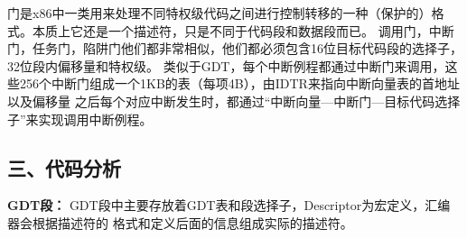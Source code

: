\documentclass[12pt,a4paper,UTF8]{ctexart}
\begin{document}
门是x86中一类用来处理不同特权级代码之间进行控制转移的一种（保护的）格式。本质上它还是一个描述符，只是不同于代码段和数据段而已。
调用门，中断门，任务门，陷阱门他们都非常相似，他们都必须包含16位目标代码段的选择子，32位段内偏移量和特权级。
类似于GDT，每个中断例程都通过中断门来调用，这些256个中断门组成一个1KB的表（每项4B），由IDTR来指向中断向量表的首地址以及偏移量
之后每个对应中断发生时，都通过“中断向量---中断门---目标代码选择子”来实现调用中断例程。

\subsection*{三、代码分析}

\textbf{GDT段：}
GDT段中主要存放着GDT表和段选择子，Descriptor为宏定义，汇编器会根据描述符的
格式和定义后面的信息组成实际的描述符。
\end{document}
